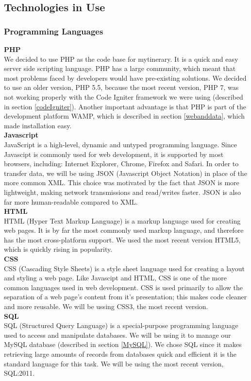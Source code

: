 \documentclass[12pt]{article}
\begin{document}
\subsection{Technologies in Use} \label{techInUse}
%
%
\subsubsection{Programming Languages}
\textbf{PHP}\\
We decided to use PHP as the code base for mytinerary. It is a quick and easy server side scripting language. PHP has a large community, which meant that most problems faced by developers would have pre-existing solutions. We decided to use an older version, PHP 5.5, because the most recent version, PHP 7, was not working properly with the Code Igniter framework we were using (described in section \ref{codeIgniter}). Another important advantage is that PHP is part of the development platform WAMP, which is described in section \ref{webanddata}, which made installation easy.
\\
%
\textbf{Javascript}\\
JavaScript is a high-level, dynamic and untyped programming language. Since Javascipt is commonly used for web development, it is supported by most browsers, including: Internet Explorer, Chrome, Firefox and Safari. In order to transfer data, we will be using JSON (Javascript Object Notation) in place of the more common XML. This choice was motivated by the fact that JSON is more lightweight, making network transmissions and read/writes faster. JSON is also far more human-readable compared to XML.\\
%
\textbf{HTML}\\
HTML (Hyper Text Markup Language) is a markup language used for creating web pages. It is by far the most commonly used markup language, and therefore has the most cross-platform support. We used the most recent version HTML5, which is quickly rising in popularity. 
\\
%
\textbf{CSS}\\
CSS (Cascading Style Sheets) is a style sheet language used for creating a layout and styling a web page. Like Javascipt and HTML, CSS is one of the more common languages used in web development. CSS is used primarily to allow the separation of a web page's content from it's presentation; this makes code cleaner and more reusable. We will be ussing CSS3, the most recent version.
%
\\
\textbf{SQL}\\
SQL (Structured Query Language) is a special-purpose programming language used to access and manipulate databases. We will be using it to manage our MySQL database (described in section \ref{MySQL}). We chose SQL since it makes retrieving large amounts of records from databases quick and efficient it is the standard language for this task. We will be using the most recent version, SQL:2011.
%
%
%
\end{document}
